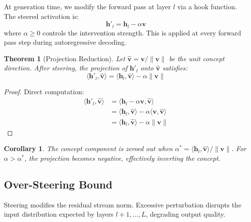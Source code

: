 \documentclass[journal, onecolumn]{IEEEtran}
\newtheorem{theorem}{Theorem}
\newtheorem{corollary}{Corollary}
\begin{document}
At generation time, we modify the forward pass at layer $l$ via a hook function. The steered activation is:
\begin{equation}
    \bm{h}'_l = \bm{h}_l - \alpha \bm{v}
    \label{eq:steering}
\end{equation}
where $\alpha \geq 0$ controls the intervention strength. This is applied at every forward pass step during autoregressive decoding.

\begin{theorem}[Projection Reduction]
\label{thm:projection}
Let $\hat{\bm{v}} = \bm{v}/\|\bm{v}\|$ be the unit concept direction. After steering, the projection of $\bm{h}'_l$ onto $\hat{\bm{v}}$ satisfies:
\begin{equation}
    \langle \bm{h}'_l, \hat{\bm{v}} \rangle = \langle \bm{h}_l, \hat{\bm{v}} \rangle - \alpha \|\bm{v}\|
\end{equation}
\end{theorem}
\begin{proof}
Direct computation:
\begin{align*}
    \langle \bm{h}'_l, \hat{\bm{v}} \rangle &= \langle \bm{h}_l - \alpha \bm{v}, \hat{\bm{v}} \rangle \\
    &= \langle \bm{h}_l, \hat{\bm{v}} \rangle - \alpha \langle \bm{v}, \hat{\bm{v}} \rangle \\
    &= \langle \bm{h}_l, \hat{\bm{v}} \rangle - \alpha \|\bm{v}\|
\end{align*}
\end{proof}

\begin{corollary}
\label{cor:zero}
The concept component is zeroed out when $\alpha^* = \langle \bm{h}_l, \hat{\bm{v}} \rangle / \|\bm{v}\|$. For $\alpha > \alpha^*$, the projection becomes negative, effectively inverting the concept.
\end{corollary}

\subsection{Over-Steering Bound}
\label{sec:oversteering}

Steering modifies the residual stream norm. Excessive perturbation disrupts the input distribution expected by layers $l+1, \ldots, L$, degrading output quality.
\end{document}
